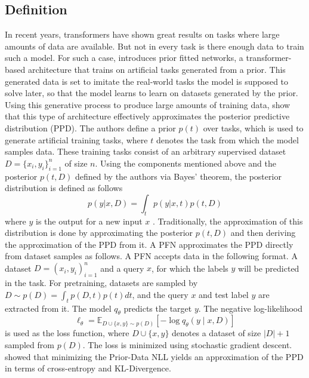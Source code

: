 \subsection{Definition}
In recent years, transformers have shown great results on tasks where large amounts of data are available.
But not in every task is there enough data to train such a model.
\newline
For such a case, \citet{muller2021transformers} introduces prior fitted networks, a transformer-based architecture that trains on artificial tasks generated from a prior.
This generated data is set to imitate the real-world tasks the model is supposed to solve later, so that the model learns to learn on datasets generated by the prior.
Using this generative process to produce large amounts of training data, \citet{muller2021transformers} show that this type of architecture effectively approximates the posterior predictive distribution (PPD).
\newline
The authors define a prior $p(t)$ over tasks, which is used to generate artificial training tasks, where $t$ denotes the task from which the model samples data.
These training tasks consist of an arbitrary supervised dataset $D=\{x_i, y_i\}^n_{i=1}$ of size $n$.
\newline
Using the components mentioned above and the posterior $p(t, D)$ defined by the authors via Bayes’ theorem, the posterior distribution is defined as follows
\[
p(y | x, D) = \int_{t} p(y|x, t)p(t, D)
\]
where $y$ is the output for a new input $x$ \citep{muller2021transformers}.
\newline
Traditionally, the approximation of this distribution is done by approximating the posterior $p(t, D)$ and then deriving the approximation of the PPD from it.
A PFN approximates the PPD directly from dataset samples as follows.
\newline
A PFN accepts data in the following format.
A dataset $D = {(x_i, y_i)}^n_{i=1}$ and a query $x$, for which the labels $y$ will be predicted in the task.
For pretraining, datasets are sampled by $D \sim p(D)=\int_t p(D, t)p(t)dt$, and the query $x$ and test label $y$ are extracted from it.
The model $q_{\theta}$ predicts the target $y$. The negative log-likelihood
\[
\ell_{\theta} = \mathbb{E}_{D \cup \{x, y\} \sim p(D)} \left[ -\log q_{\theta}(y \mid x, D) \right]
\]
is used as the loss function, where $D \cup \{x, y\}$ denotes a dataset of size $|D|+1$ sampled from $p(D)$. The loss is minimized using stochastic gradient descent.
\citet{muller2021transformers} showed that minimizing the Prior-Data NLL yields an approximation of the PPD in terms of cross-entropy and KL-Divergence.

